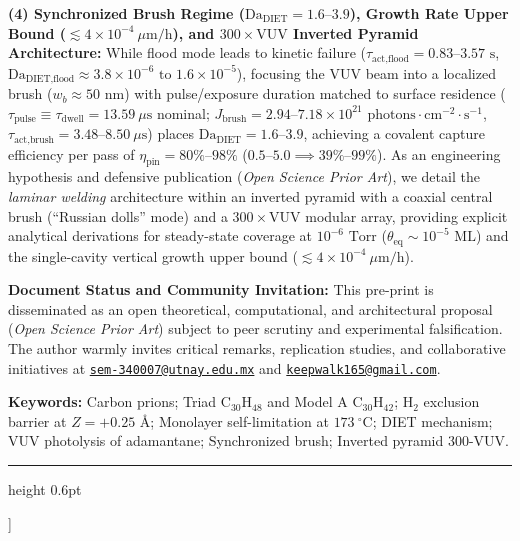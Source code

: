 \documentclass[10pt,twocolumn,a4paper]{article}
\begin{document}
\begin{@twocolumnfalse}
{    \noindent\textbf{(4) Synchronized Brush Regime ($\text{Da}_{\text{DIET}} = 1.6\text{--}3.9$), Growth Rate Upper Bound ($\lesssim 4 \times 10^{-4}\ \mu\text{m/h}$), and $300\times\text{VUV}$ Inverted Pyramid Architecture:} While flood mode leads to kinetic failure ($\tau_{\text{act,flood}} = 0.83\text{--}3.57\text{ s}$, $\text{Da}_{\text{DIET,flood}} \approx 3.8 \times 10^{-6}\text{ to }1.6 \times 10^{-5}$), focusing the VUV beam into a localized brush ($w_b \approx 50\text{ nm}$) with pulse/exposure duration matched to surface residence ($\tau_{\text{pulse}} \equiv \tau_{\text{dwell}} = 13.59\ \mu\text{s}$ nominal; $J_{\text{brush}} = 2.94\text{--}7.18 \times 10^{21}\text{ photons}\cdot\text{cm}^{-2}\cdot\text{s}^{-1}$, $\tau_{\text{act,brush}} = 3.48\text{--}8.50\ \mu\text{s}$) places $\text{Da}_{\text{DIET}} = 1.6\text{--}3.9$, achieving a covalent capture efficiency per pass of $\eta_{\text{pin}} = 80\%\text{--}98\%$ ($0.5\text{--}5.0 \implies 39\%\text{--}99\%$). As an engineering hypothesis and defensive publication (\textit{Open Science Prior Art}), we detail the \textit{laminar welding} architecture within an inverted pyramid with a coaxial central brush (``Russian dolls'' mode) and a $300\times\text{VUV}$ modular array, providing explicit analytical derivations for steady-state coverage at $10^{-6}\text{ Torr}$ ($\theta_{\text{eq}} \sim 10^{-5}\text{ ML}$) and the single-cavity vertical growth upper bound ($\lesssim 4 \times 10^{-4}\ \mu\text{m/h}$).

    \vspace{0.25em}
    \noindent\textbf{Document Status and Community Invitation:} This pre-print is disseminated as an open theoretical, computational, and architectural proposal (\textit{Open Science Prior Art}) subject to peer scrutiny and experimental falsification. The author warmly invites critical remarks, replication studies, and collaborative initiatives at \href{mailto:sem-340007@utnay.edu.mx}{\texttt{sem-340007@utnay.edu.mx}} and \href{mailto:keepwalk165@gmail.com}{\texttt{keepwalk165@gmail.com}}.

    \vspace{0.30em}
    \noindent\textbf{Keywords:} Carbon prions; Triad $\text{C}_{30}\text{H}_{48}$ and Model A $\text{C}_{30}\text{H}_{42}$; $\text{H}_2$ exclusion barrier at $Z=+0.25\text{ \AA}$; Monolayer self-limitation at $173\ ^\circ\text{C}$; DIET mechanism; VUV photolysis of adamantane; Synchronized brush; Inverted pyramid 300-VUV.
    }
    \vspace{0.35em}
    \hrule height 0.6pt
    \vspace{0.65em}
  \end{@twocolumnfalse}
]
\end{document}
